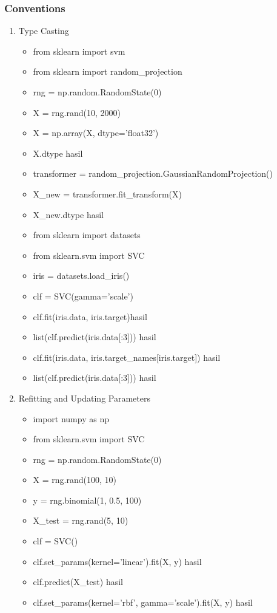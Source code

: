 \subsubsection{Conventions}
\begin{enumerate}
\item Type Casting
\begin{itemize}
\item from sklearn import svm
\item from sklearn import random\_projection
\item rng = np.random.RandomState(0)
\item X = rng.rand(10, 2000)
\item X = np.array(X, dtype='float32')
\item X.dtype hasil
\item transformer = random\_projection.GaussianRandomProjection()
\item X\_new = transformer.fit\_transform(X)
\item X\_new.dtype hasil
\item from sklearn import datasets
\item from sklearn.svm import SVC
\item iris = datasets.load\_iris()
\item clf = SVC(gamma='scale')
\item clf.fit(iris.data, iris.target)hasil
\item list(clf.predict(iris.data[:3])) hasil
\item clf.fit(iris.data, iris.target\_names[iris.target]) hasil
\item list(clf.predict(iris.data[:3])) hasil
\end{itemize}
\item Refitting and Updating Parameters
\begin{itemize}
\item import numpy as np
\item from sklearn.svm import SVC
\item rng = np.random.RandomState(0)
\item X = rng.rand(100, 10)
\item y = rng.binomial(1, 0.5, 100)
\item X\_test = rng.rand(5, 10)
\item clf = SVC()
\item clf.set\_params(kernel='linear').fit(X, y) hasil
\item clf.predict(X\_test) hasil
\item clf.set\_params(kernel='rbf', gamma='scale').fit(X, y) hasil

\end{itemize}
\end{enumerate}
